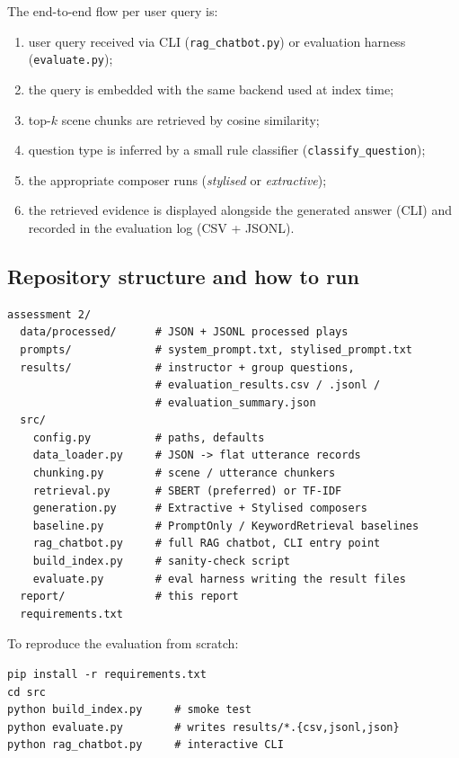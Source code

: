 \documentclass[10pt,twocolumn,a4paper]{article}
\begin{document}
The end-to-end flow per user query is:

\begin{enumerate}
    \item user query received via CLI (\verb|rag_chatbot.py|) or
        evaluation harness (\verb|evaluate.py|);
    \item the query is embedded with the same backend used at
        index time;
    \item top-$k$ scene chunks are retrieved by cosine similarity;
    \item question type is inferred by a small rule classifier
        (\verb|classify_question|);
    \item the appropriate composer runs
        (\emph{stylised} or \emph{extractive});
    \item the retrieved evidence is displayed alongside the generated
        answer (CLI) and recorded in the evaluation log (CSV + JSONL).
\end{enumerate}

\subsection{Repository structure and how to run}

\begin{verbatim}
assessment 2/
  data/processed/      # JSON + JSONL processed plays
  prompts/             # system_prompt.txt, stylised_prompt.txt
  results/             # instructor + group questions,
                       # evaluation_results.csv / .jsonl /
                       # evaluation_summary.json
  src/
    config.py          # paths, defaults
    data_loader.py     # JSON -> flat utterance records
    chunking.py        # scene / utterance chunkers
    retrieval.py       # SBERT (preferred) or TF-IDF
    generation.py      # Extractive + Stylised composers
    baseline.py        # PromptOnly / KeywordRetrieval baselines
    rag_chatbot.py     # full RAG chatbot, CLI entry point
    build_index.py     # sanity-check script
    evaluate.py        # eval harness writing the result files
  report/              # this report
  requirements.txt
\end{verbatim}

To reproduce the evaluation from scratch:

\begin{verbatim}
pip install -r requirements.txt
cd src
python build_index.py     # smoke test
python evaluate.py        # writes results/*.{csv,jsonl,json}
python rag_chatbot.py     # interactive CLI
\end{verbatim}
\end{document}

